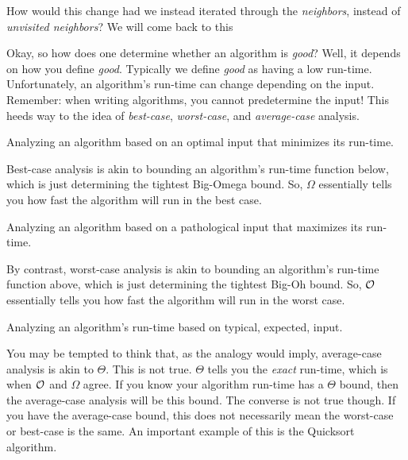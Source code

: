\documentclass[main.tex]{subfiles}
\begin{document}
\begin{rem}
	How would this change had we instead iterated through the \textit{neighbors}, instead of \textit{unvisited neighbors}? We will come back to this %
\end{rem}

Okay, so how does one determine whether an algorithm is \textit{good}? Well, it depends on how you define \textit{good}. Typically we define \textit{good} as having a low run-time. Unfortunately, an algorithm's run-time can change depending on the input. Remember: when writing algorithms, you cannot predetermine the input! This heeds way to the idea of \textit{best-case}, \textit{worst-case}, and \textit{average-case} analysis.

\begin{defn}
	Analyzing an algorithm based on an optimal input that minimizes its run-time.
\end{defn}

Best-case analysis is akin to bounding an algorithm's run-time function below, which is just determining the tightest Big-Omega bound. So, \(\Omega\) essentially tells you how fast the algorithm will run in the best case.

\begin{defn}
	Analyzing an algorithm based on a pathological input that maximizes its run-time.
\end{defn}

By contrast, worst-case analysis is akin to bounding an algorithm's run-time function above, which is just determining the tightest Big-Oh bound. So, \(\mathcal{O}\) essentially tells you how fast the algorithm will run in the worst case.

\begin{defn}
	Analyzing an algorithm's run-time based on typical, expected, input.
\end{defn}

\begin{rem}
	You may be tempted to think that, as the analogy would imply, average-case analysis is akin to \(\Theta\). This is not true. \(\Theta\) tells you the \textit{exact} run-time, which is when \(\mathcal{O}\) and \(\Omega\) agree. If you know your algorithm run-time has a \(\Theta\) bound, then the average-case analysis will be this bound. The converse is not true though. If you have the average-case bound, this does not necessarily mean the worst-case or best-case is the same. An important example of this is the Quicksort algorithm.
\end{rem}
\end{document}
